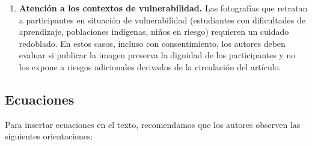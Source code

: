 \documentclass[spanish]{rbie2026}%
\begin{document}
\begin{enumerate}
  \item \textbf{Atención a los contextos de vulnerabilidad.} Las fotografías que retratan a participantes en situación de vulnerabilidad (estudiantes con dificultades de aprendizaje, poblaciones indígenas, niños en riesgo) requieren un cuidado redoblado. En estos casos, incluso con consentimiento, los autores deben evaluar si publicar la imagen preserva la dignidad de los participantes y no los expone a riesgos adicionales derivados de la circulación del artículo.
\end{enumerate}


\subsection{Ecuaciones}

Para insertar ecuaciones en el texto, recomendamos que los autores observen las siguientes orientaciones:
\end{document}
